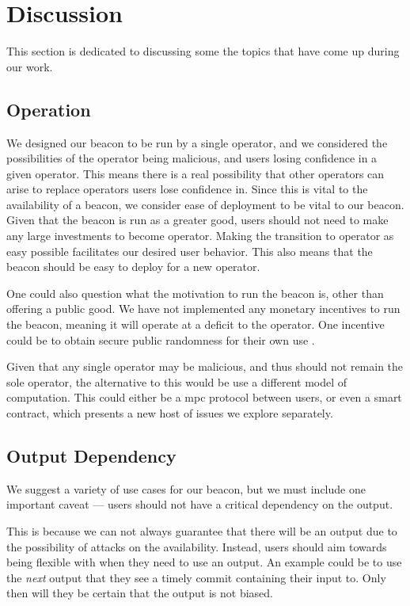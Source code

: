 \section{Discussion}%
\label{sec:discussion}
This section is dedicated to discussing some the topics that have come up during our work.
\subsection{Operation}
We designed our beacon to be run by a single operator, and we considered the possibilities of the operator being malicious, and users losing confidence in a given operator.
This means there is a real possibility that other operators can arise to replace operators users lose confidence in. Since this is vital to the availability of a beacon, we consider ease of deployment to be vital to our beacon. Given that the beacon is run as a greater good, users should not need to make any large investments to become operator. Making the transition to operator as easy possible facilitates our desired user behavior. This also means that the beacon should be easy to deploy for a new operator.

One could also question what the motivation to run the beacon is, other than offering a public good. We have not implemented any monetary incentives to run the beacon, meaning it will operate at a deficit to the operator. One incentive could be to obtain secure public randomness for their own use .

Given that any single operator may be malicious, and thus should not remain the sole operator, the alternative to this would be use a different model of computation. This could either be a \acrshort{mpc} protocol between users, or even a smart contract, which presents a new host of issues we explore separately.

\subsection{Output Dependency}
We suggest a variety of use cases for our beacon, but we must include one important caveat --- users should not have a critical dependency on the output.

This is because we can not always guarantee that there will be an output due to the possibility of attacks on the availability.
Instead, users should aim towards being flexible with when they need to use an output. An example could be to use the \textit{next} output that they see a timely commit containing their input to. Only then will they be certain that the output is not biased.


